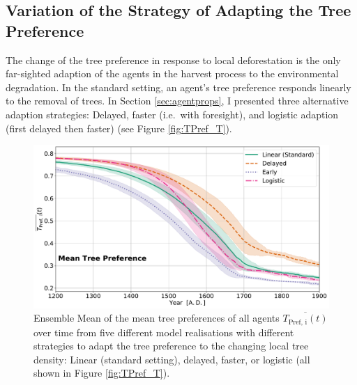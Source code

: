 \subsection{Variation of the Strategy of Adapting the Tree Preference}

The change of the tree preference in response to local deforestation is the only far-sighted adaption of the agents in the harvest process to the environmental degradation.
In the standard setting, an agent's tree preference responds linearly to the removal of trees.
In Section \ref{sec:agentprops}, I presented three alternative adaption strategies: Delayed, faster (i.e.\ with foresight), and logistic adaption (first delayed then faster) (see Figure \ref{fig:TPref_T}).
\begin{figure}
	\centering
	\includegraphics[width=1\linewidth]{images/Results/TPref/TPrefAdaption_TPref}
	\caption{Ensemble Mean of the mean tree preferences of all agents $\overline{T_\text{Pref, i}(t)}$ over time from five different model realisations with different strategies to adapt the tree preference to the changing local tree density: Linear (standard setting), delayed, faster, or logistic (all shown in Figure \ref{fig:TPref_T}).}
	\label{fig:tprefadaptiontpref}
\end{figure}
